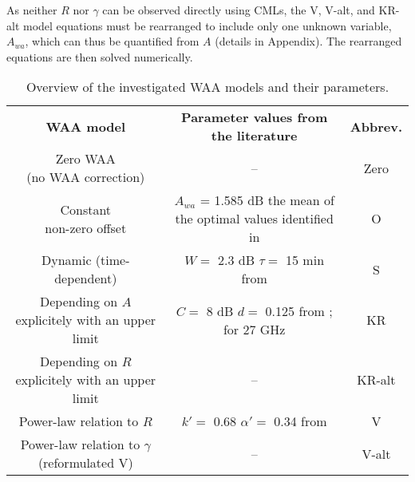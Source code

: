 \documentclass{ctuthesis}\usepackage[]{graphicx}\usepackage[]{color}
\begin{document}
As neither $R$ nor $\gamma$ can be observed directly using CMLs, the V, V-alt, and KR-alt model equations must be rearranged to include only one unknown variable, $A_{wa}$, which can thus be quantified from $A$ (details in Appendix). The rearranged equations are then solved numerically.

        


\begin{table}[h]
\small
\begin{ctucolortab}
\centering
\begin{tabular}{ c  c  c  }
        \textbf{WAA model}   &  \textbf{Parameter values from the literature}   &  \textbf{Abbrev.}    \\
        \Midrule
        \makecell{Zero WAA \\ (no WAA correction)}  &  --   &   Zero 
        \\
        \makecell{Constant \\ non-zero offset}      &  \makecell{ $A_{wa}$ = 1.585 dB \\  the mean of the optimal  values \\ identified in \cite{overeemMeasuringUrbanRainfall2011}}   &   O 
        \\
        \makecell{Dynamic (time-dependent) \\ \citep{schleissQuantificationModelingWetAntenna2013} }    &  \makecell{$W =$ 2.3 dB \quad $\tau =$ 15 min \\  from \cite{schleissQuantificationModelingWetAntenna2013}}    &     S 
        \\
        \makecell{Depending on $A$ explicitely \\ with an upper limit \\ \citep{kharadlyEffectWetAntenna2001}}    &  \makecell{$C =$ 8 dB \quad  $d =$ 0.125 \\  from \cite{kharadlyEffectWetAntenna2001}; for 27 GHz}    &     KR 
        \\
        \makecell{Depending on $R$ explicitely \\ with an upper limit}   &  --   &  KR-alt 
        \\
        \makecell{Power-law relation to $R$ \\ \citep{valtrExcessAttenuationCaused2019}}    &  \makecell{$k' =$ 0.68 \quad $\alpha' =$ 0.34 \\  from \cite{valtrExcessAttenuationCaused2019}}    &     V 
        \\
        \makecell{Power-law relation to $\gamma$ \\ (reformulated V)}    &  --    &   V-alt
\end{tabular}
\caption{Overview of the investigated WAA models and their parameters.}
\label{table:II}
\end{ctucolortab}
\end{table}
\end{document}

